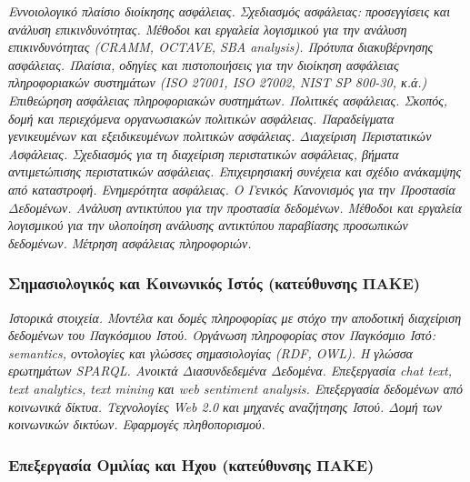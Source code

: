 \emph{Εννοιολογικό πλαίσιο διοίκησης ασφάλειας. Σχεδιασμός ασφάλειας:
προσεγγίσεις και ανάλυση επικινδυνότητας. Μέθοδοι και εργαλεία
λογισμικού για την ανάλυση επικινδυνότητας (CRAMM, OCTAVE, SBA
analysis). Πρότυπα διακυβέρνησης ασφάλειας. Πλαίσια, οδηγίες και
πιστοποιήσεις για την διοίκηση ασφάλειας πληροφοριακών συστημάτων (ISO
27001, ISO 27002, NIST SP 800-30, κ.ά.) Επιθεώρηση ασφάλειας
πληροφοριακών συστημάτων. Πολιτικές ασφάλειας. Σκοπός, δομή και
περιεχόμενα οργανωσιακών πολιτικών ασφάλειας. Παραδείγματα γενικευμένων
και εξειδικευμένων πολιτικών ασφάλειας. Διαχείριση Περιστατικών
Ασφάλειας. Σχεδιασμός για τη διαχείριση περιστατικών ασφάλειας, βήματα
αντιμετώπισης περιστατικών ασφάλειας. Επιχειρησιακή συνέχεια και σχέδιο
ανάκαμψης από καταστροφή. Ενημερότητα ασφάλειας. Ο Γενικός Κανονισμός
για την Προστασία Δεδομένων. Ανάλυση αντικτύπου για την προστασία
δεδομένων. Μέθοδοι και εργαλεία λογισμικού για την υλοποίηση ανάλυσης
αντικτύπου παραβίασης προσωπικών δεδομένων. Μέτρηση ασφάλειας
πληροφοριών.}

\hypertarget{ux3c3ux3b7ux3bcux3b1ux3c3ux3b9ux3bfux3bbux3bfux3b3ux3b9ux3baux3ccux3c2-ux3baux3b1ux3b9-ux3baux3bfux3b9ux3bdux3c9ux3bdux3b9ux3baux3ccux3c2-ux3b9ux3c3ux3c4ux3ccux3c2-ux3baux3b1ux3c4ux3b5ux3cdux3b8ux3c5ux3bdux3c3ux3b7ux3c2-ux3c0ux3b1ux3baux3b5}{%
\subsubsection{Σημασιολογικός και Κοινωνικός Ιστός (κατεύθυνσης
ΠΑΚΕ)}\label{ux3c3ux3b7ux3bcux3b1ux3c3ux3b9ux3bfux3bbux3bfux3b3ux3b9ux3baux3ccux3c2-ux3baux3b1ux3b9-ux3baux3bfux3b9ux3bdux3c9ux3bdux3b9ux3baux3ccux3c2-ux3b9ux3c3ux3c4ux3ccux3c2-ux3baux3b1ux3c4ux3b5ux3cdux3b8ux3c5ux3bdux3c3ux3b7ux3c2-ux3c0ux3b1ux3baux3b5}}

\emph{Ιστορικά στοιχεία. Μοντέλα και δομές πληροφορίας με στόχο την
αποδοτική διαχείριση δεδομένων του Παγκόσμιου Ιστού. Οργάνωση
πληροφορίας στον Παγκόσμιο Ιστό: semantics, οντολογίες και γλώσσες
σημασιολογίας (RDF, OWL). Η γλώσσα ερωτημάτων SPARQL. Ανοικτά
Διασυνδεδεμένα Δεδομένα. Επεξεργασία chat text, text analytics, text
mining και web sentiment analysis. Επεξεργασία δεδομένων από κοινωνικά
δίκτυα. Τεχνολογίες Web 2.0 και μηχανές αναζήτησης Ιστού. Δομή των
κοινωνικών δικτύων. Εφαρμογές πληθοπορισμού.}

\hypertarget{ux3b5ux3c0ux3b5ux3beux3b5ux3c1ux3b3ux3b1ux3c3ux3afux3b1-ux3bfux3bcux3b9ux3bbux3afux3b1ux3c2-ux3baux3b1ux3b9-ux3aeux3c7ux3bfux3c5-ux3baux3b1ux3c4ux3b5ux3cdux3b8ux3c5ux3bdux3c3ux3b7ux3c2-ux3c0ux3b1ux3baux3b5}{%
\subsubsection{Επεξεργασία Ομιλίας και Ήχου (κατεύθυνσης
ΠΑΚΕ)}\label{ux3b5ux3c0ux3b5ux3beux3b5ux3c1ux3b3ux3b1ux3c3ux3afux3b1-ux3bfux3bcux3b9ux3bbux3afux3b1ux3c2-ux3baux3b1ux3b9-ux3aeux3c7ux3bfux3c5-ux3baux3b1ux3c4ux3b5ux3cdux3b8ux3c5ux3bdux3c3ux3b7ux3c2-ux3c0ux3b1ux3baux3b5}}

